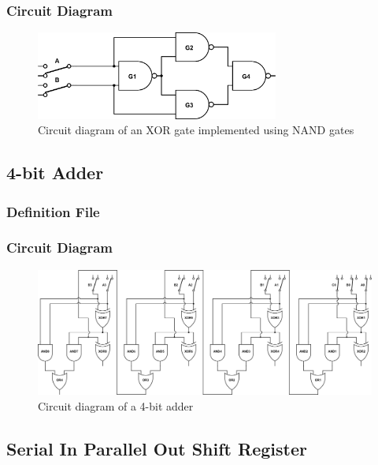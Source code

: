 \documentclass[a4paper,10pt]{article}
\begin{document}
\subsubsection{Circuit Diagram}
\begin{figure}[h]
 \centering
 \includegraphics[width=8cm]{../../examples/xor.png}
 \caption{Circuit diagram of an XOR gate implemented using NAND gates}
 \label{fig:example-xor}
\end{figure}

\subsection{4-bit Adder}

\subsubsection{Definition File}


\subsubsection{Circuit Diagram}
\begin{figure}[h]
 \centering
 \includegraphics[width=14cm]{../../examples/4-bit-adder.png}
 \caption{Circuit diagram of a 4-bit adder}
 \label{fig:example-adder}
\end{figure}

\subsection{Serial In Parallel Out Shift Register}
\end{document}

